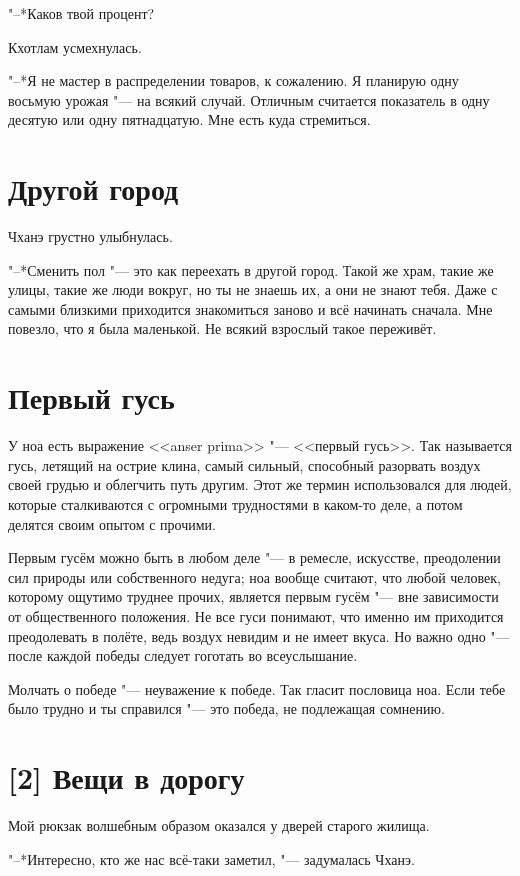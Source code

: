 "--*Каков твой процент?

Кхотлам усмехнулась.

"--*Я не мастер в распределении товаров, к сожалению.
Я планирую одну восьмую урожая "--- на всякий случай.
Отличным считается показатель в одну десятую или одну пятнадцатую.
Мне есть куда стремиться.

\section{Другой город}

Чханэ грустно улыбнулась.

"--*Сменить пол "--- это как переехать в другой город.
Такой же храм, такие же улицы, такие же люди вокруг, но ты не знаешь их, а они не знают тебя.
Даже с самыми близкими приходится знакомиться заново и всё начинать сначала.
Мне повезло, что я была маленькой.
Не всякий взрослый такое переживёт.

\section{Первый гусь}

У ноа есть выражение <<anser prima>> "--- <<первый гусь>>.
Так называется гусь, летящий на острие клина, самый сильный, способный разорвать воздух своей грудью и облегчить путь другим.
Этот же термин использовался для людей, которые сталкиваются с огромными трудностями в каком-то деле, а потом делятся своим опытом с прочими.

Первым гусём можно быть в любом деле "--- в ремесле, искусстве, преодолении сил природы или собственного недуга;
ноа вообще считают, что любой человек, которому ощутимо труднее прочих, является первым гусём "--- вне зависимости от общественного положения.
Не все гуси понимают, что именно им приходится преодолевать в полёте, ведь воздух невидим и не имеет вкуса.
Но важно одно "--- после каждой победы следует гоготать во всеуслышание.

Молчать о победе "--- неуважение к победе. 
Так гласит пословица ноа.
Если тебе было трудно и ты справился "--- это победа, не подлежащая сомнению.

\section{[2] Вещи в дорогу}

Мой рюкзак волшебным образом оказался у дверей старого жилища.

"--*Интересно, кто же нас всё-таки заметил, "--- задумалась Чханэ.

